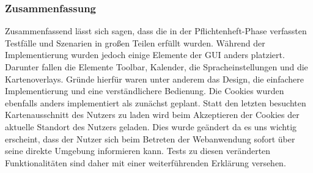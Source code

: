 \subsubsection{Zusammenfassung}
Zusammenfassend lässt sich sagen, dass die in der Pflichtenheft-Phase verfassten Testfälle und Szenarien in großen Teilen erfüllt wurden. Während der Implementierung wurden jedoch einige Elemente der GUI anders platziert. Darunter fallen die Elemente \gls{Toolbar}, Kalender, die Spracheinstellungen und die \glspl{Kartenoverlay}. Gründe hierfür waren unter anderem das Design, die einfachere Implementierung und eine verständlichere Bedienung.
Die \glspl{Cookie} wurden ebenfalls anders implementiert als zunächst geplant. Statt den letzten besuchten Kartenausschnitt des Nutzers zu laden wird beim Akzeptieren der \glspl{Cookie} der aktuelle Standort des Nutzers geladen. Dies wurde geändert da es uns wichtig erscheint, dass der Nutzer sich beim Betreten der Webanwendung sofort über seine direkte Umgebung informieren kann.
Tests zu diesen veränderten Funktionalitäten sind daher mit einer weiterführenden Erklärung versehen.